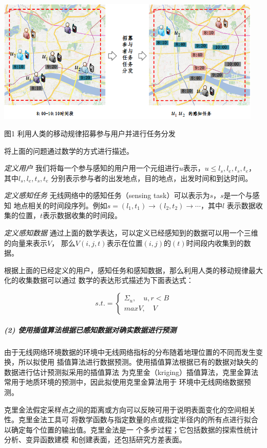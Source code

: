 \documentclass[UTF8]{ctexart}
\begin{document}
\par
\centerline{\includegraphics[width=5in]{1.png}}
\centerline{图1 利用人类的移动规律招募参与用户并进行任务分发}
将上面的问题通过数学的方式进行描述。

\emph{定义用户} 我们将每一个参与感知的用户用一个元组进行$u$表示，$u \leq l_s,l_e,t_s,t_e $，
其中$l_s,l_e,t_s,t_e$ 分别表示参与者的出发地点，目的地点，出发时间和到达时间。

\emph{定义感知任务} 无线网络中的感知任务（sensing task）可以表示为$s$，$s$是一个与感知
地点相关的时间段序列。例如$s=(l_1,t_1)\rightarrow(l_2,t_2)\rightarrow\cdots$，其中$l$
表示数据收集的位置，$t$表示数据收集的时间段。

\emph{定义感知数据} 通过上面的数学表达，可以定义已经感知到的数据可以用一个三维的向量来表示$V$，
那么$V(i,j,t)$表示在位置$(i,j)$的$(t)$时间段内收集到的数据。

根据上面的已经定义的用户，感知任务和感知数据，那么利用人类的移动规律最大化的收集数据可以通过
数学的表达形式描述为下面表达式：

\[ s.t.=
\begin{cases}
\Sigma_u, \quad u,r<B \\
max V, \quad V
\end{cases}
\]


\subparagraph{(2) 使用插值算法根据已感知数据对确实数据进行预测}
由于无线网络环境数据的环境中无线网络指标的分布随着地理位置的不同而发生变换，所以拟使用
插值算法进行数据预测。使用插值算法根据已有的数据对缺失的数据进行估计预测拟采用的插值算法
为克里金（kriging）插值算法，克里金算法常用于地质环境的预测中，因此拟使用克里金算法用于
环境中无线网络数据预测。

克里金法假定采样点之间的距离或方向可以反映可用于说明表面变化的空间相关性。克里金法工具可
将数学函数与指定数量的点或指定半径内的所有点进行拟合以确定每个位置的输出值。克里金法是一
个多步过程；它包括数据的探索性统计分析、变异函数建模 和创建表面，还包括研究方差表面。
\end{document}
